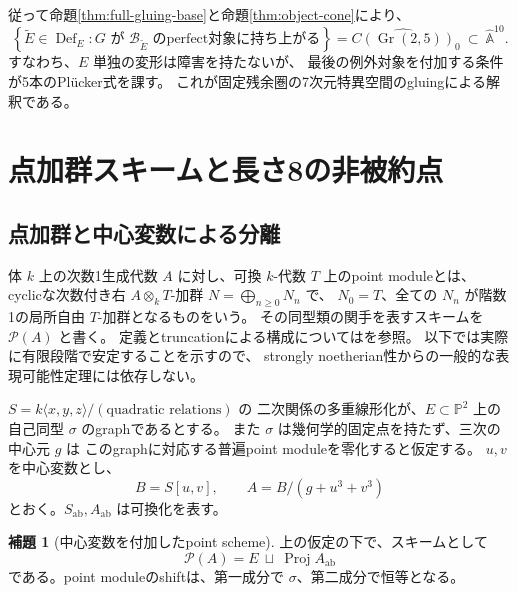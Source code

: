 \documentclass[a4paper,11pt]{ltjsarticle}
\newcommand{\mathscr}{\mathcal}
\theoremstyle{definition}
\newtheorem{lemma}[theorem]{補題}
\newcommand{\PP}{\mathbb P}
\newcommand{\Aff}{\mathbb A}
\newcommand{\Gr}{\operatorname{Gr}}
\newcommand{\Def}{\operatorname{Def}}
\begin{document}
従って命題\ref{thm:full-gluing-base}と命題\ref{thm:object-cone}により、
\[
 \left\{\widetilde E\in\Def_E:
 G\text{ が }\mathcal B_{\widetilde E}\text{ のperfect対象に持ち上がる}\right\}
 =
 \widehat{C(\Gr(2,5))}_0\ \subset\ \widehat{\Aff}^{10}.
\]
すなわち、$E$ 単独の変形は障害を持たないが、
最後の例外対象を付加する条件が5本のPlücker式を課す。
これが固定残余圏の7次元特異空間のgluingによる解釈である。

\section{点加群スキームと長さ8の非被約点}\label{sec:points}

\subsection{点加群と中心変数による分離}

体 $k$ 上の次数1生成代数 $A$ に対し、可換 $k$-代数 $T$ 上のpoint moduleとは、
cyclicな次数付き右 $A\otimes_kT$-加群 $N=\bigoplus_{n\ge0}N_n$ で、
$N_0=T$、全ての $N_n$ が階数1の局所自由 $T$-加群となるものをいう。
その同型類の関手を表すスキームを $\mathscr P(A)$ と書く。
定義とtruncationによる構成については\cite[Section 4]{RZ}を参照。
以下では実際に有限段階で安定することを示すので、
strongly noetherian性からの一般的な表現可能性定理には依存しない。

$S=k\langle x,y,z\rangle/(\text{quadratic relations})$ の
二次関係の多重線形化が、$E\subset\PP^2$ 上の自己同型 $\sigma$ のgraphであるとする。
また $\sigma$ は幾何学的固定点を持たず、三次の中心元 $g$ は
このgraphに対応する普遍point moduleを零化すると仮定する。
$u,v$ を中心変数とし、
\[
 B=S[u,v],\qquad A=B/(g+u^3+v^3)
\]
とおく。$S_{\mathrm{ab}},A_{\mathrm{ab}}$ は可換化を表す。

\begin{lemma}[中心変数を付加したpoint scheme]\label{lem:point-splitting}
上の仮定の下で、スキームとして
\[
 \mathscr P(A)=E\ \sqcup\ \operatorname{Proj}A_{\mathrm{ab}}
\]
である。point moduleのshiftは、第一成分で $\sigma$、第二成分で恒等となる。
\end{lemma}
\end{document}
